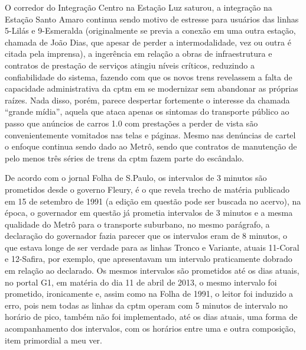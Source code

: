 \documentclass[11pt,fleqn]{book} %
\begin{document}
O corredor do Integração Centro na Estação Luz saturou, a integração na Estação Santo Amaro continua sendo motivo de estresse para usuários das linhas 5-Lilás e 9-Esmeralda (originalmente se previa a conexão em uma outra estação, chamada de João Dias, que apesar de perder a intermodalidade, vez ou outra é citada pela imprensa), a ingerência em relação a obras de infraestrutura e contratos de prestação de serviços atingiu níveis críticos, reduzindo a confiabilidade do sistema, fazendo com que os novos trens revelassem a falta de capacidade administrativa da \gls{cptm} em se modernizar sem abandonar as próprias raízes. Nada disso, porém, parece despertar fortemente o interesse da chamada “grande mídia”, aquela que ataca apenas os sintomas do transporte público ao passo que anúncios de carros 1.0 com prestações a perder de vista são convenientemente vomitados nas telas e páginas. Mesmo nas denúncias de cartel o enfoque continua sendo dado ao Metrô, sendo que contratos de manutenção de pelo menos três séries de trens da \gls{cptm} fazem parte do escândalo.

De acordo com o jornal Folha de S.Paulo, os intervalos de 3 minutos são prometidos desde o governo Fleury, é o que revela trecho de matéria publicado em 15 de setembro de 1991 (a edição em questão pode ser buscada no acervo), na época, o governador em questão já prometia intervalos de 3 minutos e a mesma qualidade do Metrô para o transporte suburbano, no mesmo parágrafo, a declaração do governador fazia parecer que os intervalos eram de 8 minutos, o que estava longe de ser verdade para as linhas Tronco e Variante, atuais 11-Coral e 12-Safira, por exemplo, que apresentavam um intervalo praticamente dobrado em relação ao declarado. Os mesmos intervalos são prometidos até os dias atuais, no portal G1, em matéria do dia 11 de abril de 2013, o mesmo intervalo foi prometido, ironicamente e, assim como na Folha de 1991, o leitor foi induzido a erro, pois nem todas as linhas da \gls{cptm} operam com 5 minutos de intervalo no horário de pico, também não foi implementado, até os dias atuais, uma forma de acompanhamento dos intervalos, com os horários entre uma e outra composição, item primordial a meu ver.
\end{document}
